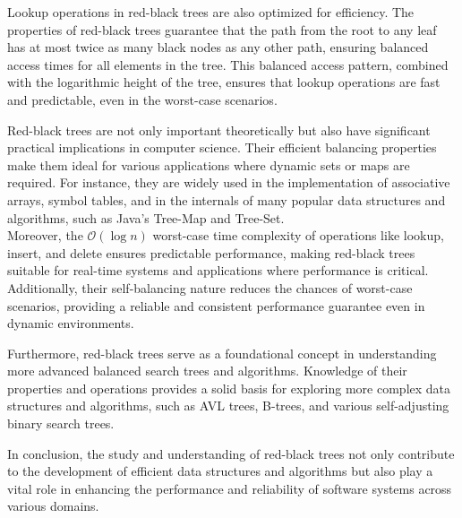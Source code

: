 \documentclass{article}[10pt]
\begin{document}
Lookup operations in red-black trees are also optimized for efficiency. The properties of red-black trees guarantee that the path from the root to any leaf has at most twice as many black nodes as any other path, ensuring balanced access times for all elements in the tree. This balanced access pattern, combined with the logarithmic height of the tree, ensures that lookup operations are fast and predictable, even in the worst-case scenarios.

Red-black trees are not only important theoretically but also have significant practical implications in computer science. Their efficient balancing properties make them ideal for various applications where dynamic sets or maps are required. For instance, they are widely used in the implementation of associative arrays, symbol tables, and in the internals of many popular data structures and algorithms, such as Java's\cite{weiss2007data} Tree-Map and Tree-Set.\\
Moreover, the $\mathcal{O}(\log n)$ worst-case time complexity of operations like lookup, insert, and delete ensures predictable performance, making red-black trees suitable for real-time systems and applications where performance is critical. Additionally, their self-balancing nature reduces the chances of worst-case scenarios, providing a reliable and consistent performance guarantee even in dynamic environments.

Furthermore, red-black trees serve as a foundational concept in understanding more advanced balanced search trees and algorithms. Knowledge of their properties and operations provides a solid basis for exploring more complex data structures and algorithms, such as AVL trees, B-trees, and various self-adjusting binary search trees.

In conclusion, the study and understanding of red-black trees not only contribute to the development of efficient data structures and algorithms but also play a vital role in enhancing the performance and reliability of software systems across various domains.





\end{document}
